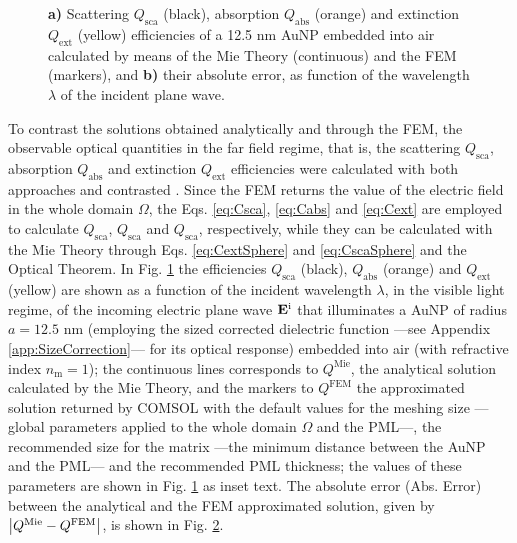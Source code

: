 \begin{figure}[b!]
 \def\svgwidth{.9\textwidth}
 \small
 \centering
    \hspace*{-.95\textwidth}
     \begin{subfigure}{\textwidth}\caption{}\label{fig:Eff:First:a}\end{subfigure}\\[11.5em]
    \hspace*{-.95\textwidth}
     \begin{subfigure}{\textwidth}\caption{}\label{fig:Eff:First:b}\end{subfigure}\\[-15em]
\caption[Scattering, Absorption and Extinction Efficiencies of a 12.5 nm AuNP$@$Air: Analytical and FEM solutions with no optimization]{\textbf{a)} Scattering $Q_\text{sca}$ (black), absorption $Q_\text{abs}$ (orange) and extinction $Q_\text{ext}$ (yellow) efficiencies of a 12.5 nm AuNP embedded into air calculated by means of the Mie Theory (continuous) and the FEM (markers), and \textbf{b)} their absolute error, as function of the wavelength $\lambda$ of the incident plane wave.}
\label{fig:Eff:First}
\end{figure}
%

To contrast the solutions obtained analytically and through the FEM, the observable optical quantities in the far field regime, that is, the scattering $Q_\text{sca}$, absorption $Q_\text{abs}$ and extinction $Q_\text{ext}$ efficiencies were calculated with both approaches and contrasted . Since the FEM returns the value of the electric field in the whole domain $\Omega$, the Eqs. \eqref{eq:Csca}, \eqref{eq:Cabs} and \eqref{eq:Cext} are employed to calculate $Q_\text{sca}$, $Q_\text{sca}$ and $Q_\text{sca}$, respectively, while they can be calculated with the Mie Theory through Eqs. \eqref{eq:CextSphere} and \eqref{eq:CscaSphere} and the Optical Theorem. In Fig. \ref{fig:Eff:First:a} the efficiencies  $Q_\text{sca}$ (black),  $Q_\text{abs}$ (orange) and $Q_\text{ext}$ (yellow) are shown as a function of the incident wavelength $\lambda$, in the visible light regime,  of the incoming electric plane wave $\vb{E}^\text{i}$ that illuminates a AuNP of radius $a = 12.5$ nm (employing the sized corrected dielectric function ---see Appendix \ref{app:SizeCorrection}--- for its optical response) embedded into air (with refractive index $n_\text{m} = 1$); the continuous lines corresponds to $Q^\text{Mie}$, the analytical solution calculated by the Mie Theory, and the markers to $Q^\text{FEM}$ the approximated solution returned by COMSOL with the default values for the meshing size ---global parameters applied to the whole domain $\Omega$ and the PML---, the recommended size for the matrix ---the minimum distance between the AuNP and the PML--- and the recommended PML thickness; the values of these parameters are shown in Fig. \ref{fig:Eff:First:a} as inset text. The absolute error (Abs. Error) between the analytical and the FEM  approximated solution, given by $\abs{Q^\text{Mie}-Q^\text{FEM}}$, is shown in Fig. \ref{fig:Eff:First:b}.

